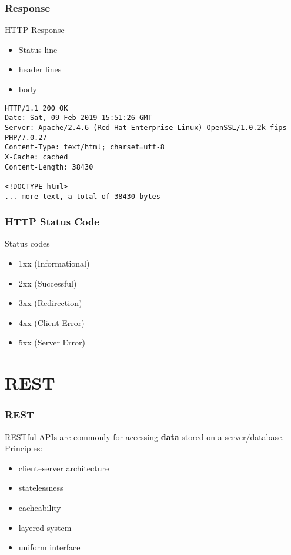 \begin{frame}[fragile]\frametitle{Response}
\color{structure}
HTTP Response
\begin{itemize}\color{structure}
\item  Status line
\item  header lines
\item  body
\end{itemize}

\begin{verbatim}
HTTP/1.1 200 OK
Date: Sat, 09 Feb 2019 15:51:26 GMT
Server: Apache/2.4.6 (Red Hat Enterprise Linux) OpenSSL/1.0.2k-fips PHP/7.0.27
Content-Type: text/html; charset=utf-8
X-Cache: cached
Content-Length: 38430

<!DOCTYPE html>
... more text, a total of 38430 bytes
\end{verbatim}
\end{frame}

\begin{frame}[fragile]\frametitle{HTTP Status Code}
\color{structure}
Status codes
\begin{itemize}
  \item  1xx (Informational)
  \item  2xx (Successful)
  \item  3xx (Redirection)
  \item  4xx (Client Error)
  \item  5xx (Server Error)
\end{itemize}
\end{frame}

\section{REST}
\begin{frame}[fragile]\frametitle{REST}
RESTful APIs are commonly for accessing {\bf data} stored on a server/database.
\vspace{3mm}
\\Principles:
\begin{itemize}
  \item client–server architecture
  \item statelessness
  \item cacheability
  \item layered system
  \item uniform interface
\end{itemize}
\end{frame}

